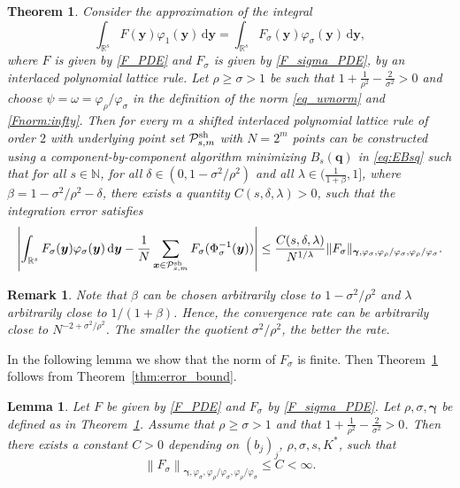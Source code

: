\documentclass[namedate,webpdf,imanum]{ima-authoring-arxiv}%
\theoremstyle{thmstyletwo}%
\newtheorem{theorem}{Theorem}%
\newtheorem{lemma}{Lemma}
\newtheorem{remark}{Remark}%
\numberwithin{equation}{section}
\newcommand{\bsx}{\boldsymbol{x}}
\newcommand{\bsy}{\boldsymbol{y}}
\newcommand{\bsq}{\boldsymbol{q}}
\newcommand{\bsgamma}{\boldsymbol{\gamma}}
\newcommand{\NN}{\mathbb{N}}
\newcommand{\cP}{\mathcal{P}}
\begin{document}
\begin{theorem}\label{thm:pde_app}
Consider the approximation of the integral $$\int_{\mathbb{R}^s} F(\bsy) \varphi_1(\bsy) \,\mathrm{d} \bsy = \int_{\mathbb{R}^s} F_\sigma(\bsy) \varphi_\sigma(\bsy) \,\mathrm{d} \bsy, $$ where $F$  is given by \eqref{F_PDE} and $F_\sigma$ is given by \eqref{F_sigma_PDE}, by an interlaced polynomial lattice rule. Let $\rho \ge \sigma > 1$ be such that $1 + \tfrac{1}{\rho^2} - \tfrac{2}{\sigma^2} > 0$ and choose $\psi=\omega=\varphi_{\rho}/\varphi_{\sigma}$ in the definition of the norm \eqref{eq_uvnorm} and \eqref{Fnorm:infty}.
%
Then for every $m$ a shifted interlaced polynomial lattice rule of order $2$ with underlying point set $\cP_{s,m}^{{\rm sh}}$ with $N=2^m$ points can be constructed using a component-by-component algorithm minimizing $B_s(\bsq)$ in \eqref{eq:EBsq} such that for all $s \in \NN$, for all $\delta \in (0, 1-\sigma^2/\rho^2)$ and all $\lambda \in (\frac{1}{1+\beta},1]$, where $\beta = 1 - \sigma^2/\rho^2 - \delta$, there exists a quantity $C(s,\delta,\lambda) > 0$, such that the integration error satisfies 
\begin{equation*}
\left| \int_{\mathbb{R}^s} F_\sigma(\bsy) \varphi_\sigma(\bsy) \,\mathrm{d} \bsy - \frac{1}{N} \sum_{\bsx \in \cP_{s,m}^{{\rm sh}}} F_\sigma(\Phi_\sigma^{-1}(\bsy)) \right| \le \frac{C(s,\delta,\lambda)}{N^{1/\lambda}} %
\|F_\sigma\|_{\bsgamma, \varphi_\sigma, \varphi_\rho/\varphi_\sigma, \varphi_\rho/\varphi_\sigma}.
\end{equation*} 


\end{theorem}

\begin{remark}
Note that $\beta$ can be chosen arbitrarily close to $1-\sigma^2/\rho^2$ and $\lambda$ arbitrarily close to $1/(1+\beta)$. Hence, the convergence rate can be arbitrarily close to $N^{-2+\sigma^2/\rho^2}$.  The smaller the quotient $\sigma^2/\rho^2$, the better the rate.
\end{remark}


In the following lemma we show that the norm of $F_\sigma$ is finite. Then Theorem~\ref{thm:pde_app} follows from Theorem~\ref{thm:error_bound}.

\begin{lemma}\label{lem:bound_normF}
Let $F$ be given by \eqref{F_PDE} and $F_\sigma$ by \eqref{F_sigma_PDE}. Let $\rho, \sigma, \bsgamma$ be defined as in Theorem~\ref{thm:pde_app}. Assume that $\rho \ge \sigma > 1$ and that $1 + \tfrac{1}{\rho^2} - \tfrac{2}{\sigma^2} > 0$. Then there exists a constant $C> 0$ depending on  $(b_j)_j$, $\rho, \sigma, s, K^*$, such that
\begin{equation*}
\left\| F_{\sigma} \right\|_{\bsgamma,\varphi_\sigma,\varphi_\rho/\varphi_\sigma,\varphi_\rho / \varphi_\sigma} \le C < \infty. %
\end{equation*}
\end{lemma}
\end{document}
